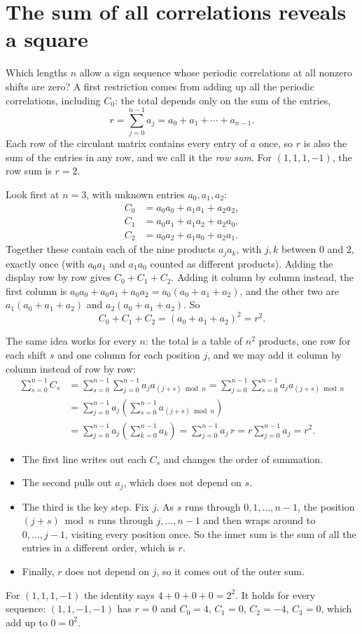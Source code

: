 \section{The sum of all correlations reveals a square}\label{ch14:sec:square}
Which lengths $n$ allow a sign sequence whose periodic correlations at all nonzero shifts are zero? A first restriction comes from adding up all the periodic correlations, including $C_0$: the total depends only on the sum of the entries,
\[
r=\sum_{j=0}^{n-1}a_j=a_0+a_1+\cdots+a_{n-1}.
\]
Each row of the circulant matrix contains every entry of $a$ once, so $r$ is also the sum of the entries in any row, and we call it the \emph{row sum}. For $(1,1,1,-1)$, the row sum is $r=2$.

Look first at $n=3$, with unknown entries $a_0,a_1,a_2$:
\begin{align*}
 C_0&=a_0a_0+a_1a_1+a_2a_2,\\
 C_1&=a_0a_1+a_1a_2+a_2a_0,\\
 C_2&=a_0a_2+a_1a_0+a_2a_1.
\end{align*}
Together these contain each of the nine products $a_ja_k$, with $j,k$ between $0$ and $2$, exactly once (with $a_0a_1$ and $a_1a_0$ counted as different products). Adding the display row by row gives $C_0+C_1+C_2$. Adding it column by column instead, the first column is $a_0a_0+a_0a_1+a_0a_2=a_0(a_0+a_1+a_2)$, and the other two are $a_1(a_0+a_1+a_2)$ and $a_2(a_0+a_1+a_2)$. So
\[
C_0+C_1+C_2=(a_0+a_1+a_2)^2=r^2.
\]

The same idea works for every $n$: the total is a table of $n^2$ products, one row for each shift $s$ and one column for each position $j$, and we may add it column by column instead of row by row:
\begin{align*}
\sum_{s=0}^{n-1}C_s
&=\sum_{s=0}^{n-1}\sum_{j=0}^{n-1}a_j a_{(j+s)\bmod n}
 =\sum_{j=0}^{n-1}\sum_{s=0}^{n-1}a_j a_{(j+s)\bmod n}\\
&=\sum_{j=0}^{n-1}a_j\left(\sum_{s=0}^{n-1}a_{(j+s)\bmod n}\right)\\
&=\sum_{j=0}^{n-1}a_j\left(\sum_{k=0}^{n-1}a_k\right)
 =\sum_{j=0}^{n-1}a_j\,r=r\sum_{j=0}^{n-1}a_j=r^2.
\end{align*}
\begin{itemize}
\item The first line writes out each $C_s$ and changes the order of summation.
\item The second pulls out $a_j$, which does not depend on $s$.
\item The third is the key step. Fix $j$. As $s$ runs through $0,1,\ldots,n-1$, the position $(j+s)\bmod n$ runs through $j,\ldots,n-1$ and then wraps around to $0,\ldots,j-1$, visiting every position once. So the inner sum is the sum of all the entries in a different order, which is $r$.
\item Finally, $r$ does not depend on $j$, so it comes out of the outer sum.
\end{itemize}
For $(1,1,1,-1)$ the identity says $4+0+0+0=2^2$. It holds for every sequence: $(1,1,-1,-1)$ has $r=0$ and $C_0=4$, $C_1=0$, $C_2=-4$, $C_3=0$, which add up to $0=0^2$.

